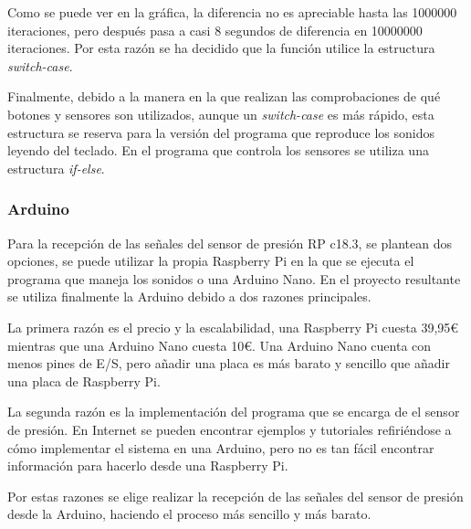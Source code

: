 \documentclass{article}
\begin{document}
            Como se puede ver en la gráfica, la diferencia no es apreciable hasta las 1000000 iteraciones, pero después
            pasa a casi 8 segundos de diferencia en 10000000 iteraciones. Por esta razón se ha decidido que la función
            utilice la estructura \textit{switch-case}.\newline

            Finalmente, debido a la manera en la que realizan las comprobaciones de qué botones y sensores son
            utilizados, aunque un \textit{switch-case} es más rápido, esta estructura se reserva para la versión del
            programa que reproduce los sonidos leyendo del teclado. En el programa que controla los sensores se utiliza
            una estructura \textit{if-else}.



    \subsubsection{Arduino} %
    \label{ssub:Arduino}

        Para la recepción de las señales del sensor de presión RP c18.3, se plantean dos opciones, se puede utilizar
        la propia Raspberry Pi en la que se ejecuta el programa que maneja los sonidos o una Arduino Nano. En el
        proyecto resultante se utiliza finalmente la Arduino debido a dos razones principales.\newline

        La primera razón es el precio y la escalabilidad, una Raspberry Pi cuesta 39,95\euro{} mientras que una
        Arduino Nano cuesta 10\euro{}. Una Arduino Nano cuenta con menos pines de E/S, pero añadir una placa es más
        barato y sencillo que añadir una placa de Raspberry Pi.\newline

        La segunda razón es la implementación del programa que se encarga de el sensor de presión. En Internet se
        pueden encontrar ejemplos y tutoriales refiriéndose a cómo implementar el sistema en una Arduino, pero no
        es tan fácil encontrar información para hacerlo desde una Raspberry Pi.\newline

        Por estas razones se elige realizar la recepción de las señales del sensor de presión desde la Arduino,
        haciendo el proceso más sencillo y más barato.
\end{document}

